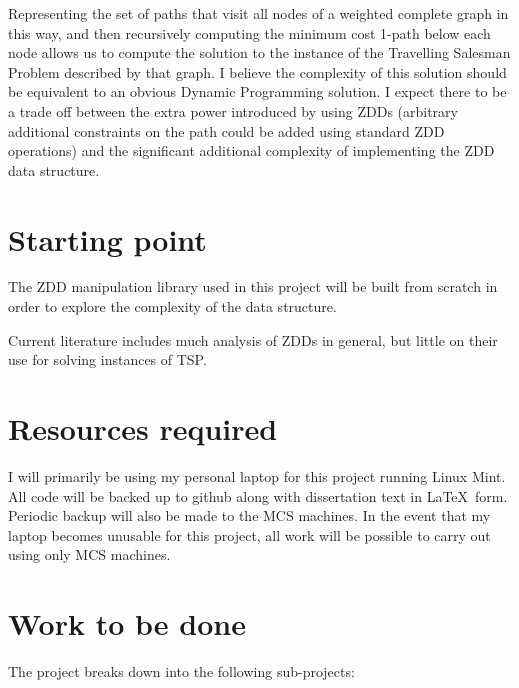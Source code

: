 \documentclass[12pt,a4paper,twoside]{article}
\begin{document}
Representing the set of paths that visit all nodes of a weighted complete graph in this way, and then recursively computing the minimum cost 1-path below each node allows us to compute the solution to the instance of the Travelling Salesman Problem described by that graph. I believe the complexity of this solution should be equivalent to an obvious Dynamic Programming solution. I expect there to be a trade off between the extra power introduced by using ZDDs (arbitrary additional constraints on the path could be added using standard ZDD operations) and the significant additional complexity of implementing the ZDD data structure.

\section*{Starting point}

The ZDD manipulation library used in this project will be built from scratch in order to explore the complexity of the data structure.

Current literature includes much analysis of ZDDs in general\cite{history}, but little on their use for solving instances of TSP.

\section*{Resources required}

I will primarily be using my personal laptop for this project running Linux Mint. All code will be backed up to github along with dissertation text in \LaTeX~form. Periodic backup will also be made to the MCS machines. In the event that my laptop becomes unusable for this project, all work will be possible to carry out using only MCS machines.

\section*{Work to be done}

The project breaks down into the following sub-projects:
\end{document}
